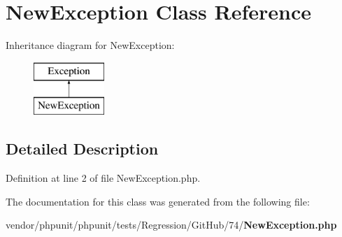 \section{New\+Exception Class Reference}
\label{class_new_exception}
Inheritance diagram for New\+Exception\+:\begin{figure}[H]
\begin{center}
\leavevmode
\includegraphics[height=2.000000cm]{class_new_exception}
\end{center}
\end{figure}


\subsection{Detailed Description}


Definition at line 2 of file New\+Exception.\+php.



The documentation for this class was generated from the following file\+:\begin{DoxyCompactItemize}
\item 
vendor/phpunit/phpunit/tests/\+Regression/\+Git\+Hub/74/{\bf New\+Exception.\+php}\end{DoxyCompactItemize}
